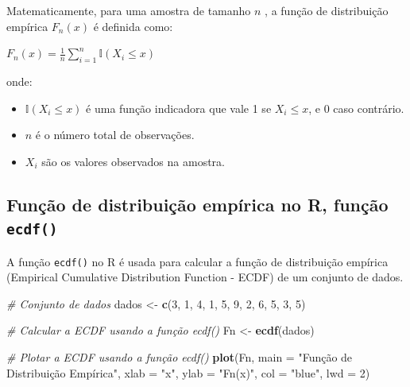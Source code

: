 \documentclass[
]{book}
\newenvironment{Shaded}{\begin{snugshade}}{\end{snugshade}}
\newcommand{\AttributeTok}[1]{\textcolor[rgb]{0.13,0.29,0.53}{#1}}
\newcommand{\CommentTok}[1]{\textcolor[rgb]{0.56,0.35,0.01}{\textit{#1}}}
\newcommand{\DecValTok}[1]{\textcolor[rgb]{0.00,0.00,0.81}{#1}}
\newcommand{\FunctionTok}[1]{\textcolor[rgb]{0.13,0.29,0.53}{\textbf{#1}}}
\newcommand{\NormalTok}[1]{#1}
\newcommand{\OtherTok}[1]{\textcolor[rgb]{0.56,0.35,0.01}{#1}}
\newcommand{\StringTok}[1]{\textcolor[rgb]{0.31,0.60,0.02}{#1}}
\providecommand{\tightlist}{%
  \setlength{\itemsep}{0pt}\setlength{\parskip}{0pt}}
\begin{document}
Matematicamente, para uma amostra de tamanho \(n\) , a função de distribuição empírica \(F_n(x)\) é definida como:

\(F_n(x) = \frac{1}{n} \sum_{i=1}^n \mathbb{I}(X_i \leq x)\)

onde:

\begin{itemize}
\tightlist
\item
  \(\mathbb{I}(X_i \leq x)\) é uma função indicadora que vale 1 se \(X_i \leq x\), e 0 caso contrário.
\item
  \(n\) é o número total de observações.
\item
  \(X_i\) são os valores observados na amostra.
\end{itemize}

\subsection{\texorpdfstring{Função de distribuição empírica no R, função \texttt{ecdf()}}{Função de distribuição empírica no R, função ecdf()}}\label{funuxe7uxe3o-de-distribuiuxe7uxe3o-empuxedrica-no-r-funuxe7uxe3o-ecdf}

A função \texttt{ecdf()} no R é usada para calcular a função de distribuição
empírica (Empirical Cumulative Distribution Function - ECDF) de um
conjunto de dados.

\begin{Shaded}
\begin{Highlighting}[]
\CommentTok{\# Conjunto de dados}
\NormalTok{dados }\OtherTok{\textless{}{-}} \FunctionTok{c}\NormalTok{(}\DecValTok{3}\NormalTok{, }\DecValTok{1}\NormalTok{, }\DecValTok{4}\NormalTok{, }\DecValTok{1}\NormalTok{, }\DecValTok{5}\NormalTok{, }\DecValTok{9}\NormalTok{, }\DecValTok{2}\NormalTok{, }\DecValTok{6}\NormalTok{, }\DecValTok{5}\NormalTok{, }\DecValTok{3}\NormalTok{, }\DecValTok{5}\NormalTok{)}

\CommentTok{\# Calcular a ECDF usando a função ecdf()}
\NormalTok{Fn }\OtherTok{\textless{}{-}} \FunctionTok{ecdf}\NormalTok{(dados)}

\CommentTok{\# Plotar a ECDF usando a função ecdf()}
\FunctionTok{plot}\NormalTok{(Fn, }\AttributeTok{main =} \StringTok{"Função de Distribuição Empírica"}\NormalTok{, }\AttributeTok{xlab =} \StringTok{"x"}\NormalTok{, }\AttributeTok{ylab =} \StringTok{"Fn(x)"}\NormalTok{, }\AttributeTok{col =} \StringTok{"blue"}\NormalTok{, }\AttributeTok{lwd =} \DecValTok{2}\NormalTok{)}
\end{Highlighting}
\end{Shaded}
\end{document}
